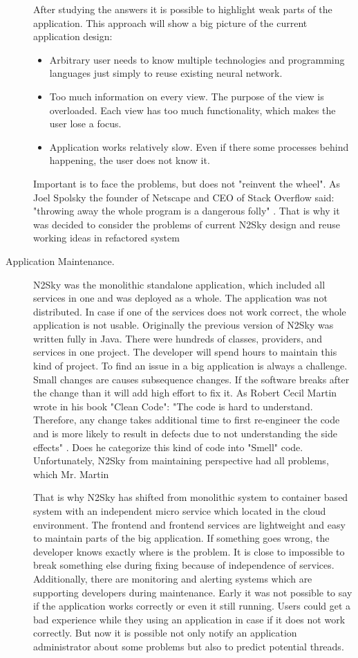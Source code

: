 \begin{description}
After studying the answers it is possible to highlight weak parts of the application. This approach will show a big picture of the current application design:

\begin{itemize}
\item Arbitrary user needs to know multiple technologies and programming languages just simply to reuse existing neural network. 
\item Too much information on every view. The purpose of the view is overloaded. Each view has too much functionality, which makes the user lose a focus.
\item Application works relatively slow. Even if there some processes behind happening, the user does not know it.
\end{itemize}

Important is to face the problems, but does not "reinvent the wheel".  As Joel Spolsky the founder of Netscape and CEO of Stack Overflow said: "throwing away the whole program is a dangerous folly" \cite{joel}. That is why it was decided to consider the problems of current N2Sky design and reuse working ideas in refactored system

\item[Application Maintenance.]
N2Sky was the monolithic standalone application, which included all services in one and was deployed as a whole. The application was not distributed.  In case if one of the services does not work correct, the whole application is not usable. 
Originally the previous version of N2Sky was written fully in Java. There were hundreds of classes, providers, and services in one project. The developer will spend hours to maintain this kind of project. To find an issue in a big application is always a challenge.  Small changes are causes subsequence changes. If the software breaks after the change than it will add high effort to fix it. As Robert Cecil Martin wrote in his book "Clean Code": "The code is hard to understand. Therefore, any change takes additional time to first re-engineer the code and is more likely to result in defects due to not understanding the side effects" \cite{cleancode}.  Does he categorize this kind of code into "Smell" code. Unfortunately, N2Sky from maintaining perspective had all problems, which Mr. Martin

That is why N2Sky has shifted from monolithic system to container based system with an independent micro service which located in the cloud environment. 
The frontend and frontend services are lightweight and easy to maintain parts of the big application. If something goes wrong, the developer knows exactly where is the problem. It is close to impossible to break something else during fixing because of independence of services. 
Additionally, there are monitoring and alerting systems which are supporting developers during maintenance.  Early it was not possible to say if the application works correctly or even it still running. Users could get a bad experience while they using an application in case if it does not work correctly. But now it is possible not only notify an application administrator about some problems but also to predict potential threads. 
\end{description}


